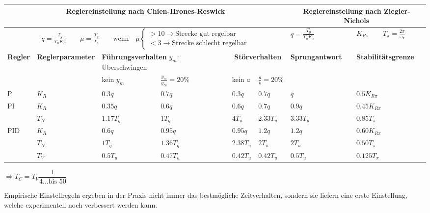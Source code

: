 	\begin{tabular}{|l|p{1.8cm}|l|l|l|l||l|l|}
	    \hline
	    \multicolumn{6}{|c||}{
	      \textbf{Reglereinstellung nach Chien-Hrones-Reswick}
	    } &
	    \multicolumn{2}{|c|}{
	      \textbf{Reglereinstellung nach Ziegler-Nichols}
	    }
		\\ \hline
		\multicolumn{6}{|c||}{
		  $
		  q = \frac{T_g}{T_uK_S} \qquad \mu = \frac{T_g}{T_u}
		  \qquad \text{wenn} \quad \mu
		  \begin{cases}
		    > 10 \rightarrow \text{Strecke gut regelbar} \\
		    < 3 \rightarrow \text{Strecke schlecht regelbar}
		  \end{cases}
		  $
		} & $q=\frac{T_g}{T_uK_s}$ & $K_{R\pi} \qquad T_\pi=\frac{2\pi}{\omega_\pi}$
		\\ \hline
		\textbf{Regler} & \textbf{Regler\-parameter} &
		\multicolumn{2}{|p{3.5cm}|}{\textbf{Führungsverhalten} \newline $y_m$:
		Überschwingen} &
		\multicolumn{2}{|c||}{\textbf{Störverhalten}} &
		\textbf{Sprungantwort} & \textbf{Stabilitätsgrenze}
		\\ \hline
		& & kein $y_m$ & $\frac{y_m}{y_\infty} = 20 \%$ & kein $a$ & $\frac{a}{b}= 20 \%$ & &
		\\ \hline
		P 	& $K_R$ 	& $0.3q$ 	& $0.7q$ 	& $0.3q$ 	& $0.7q$	& $q$ 	& $0.5K_{R\pi}$
		\\ \hline
		PI	& $K_R$		& $0.35q$	& $0.6q$	& $0.6q$	& $0.7q$	& $0.9q$ 	& $0.45K_{R\pi}$
		\\
		    & $T_N$		& $1.17T_g$	& $1T_g$	& $4T_u$	& $2.33T_u$ & $3.33T_u$ &
		    $0.85T_{\pi}$ \\ \hline
		PID & $K_R$		& $0.6q$	& $0.95q$	& $0.95q$	& $1.2q$ 	& $1.2q$ 	& $0.60K_{R\pi}$
		\\
			& $T_N$		& $1T_g$	& $1.36T_g$	& $2.38T_u$	& $2T_u$ 	& $2T_u$	& $0.50T_\pi$
		\\
			& $T_V$		& $0.5T_u$	& $0.47T_u$	& $0.42T_u$	& $0.42T_u$ & $0.5T_u$ 	& $0.125T_\pi$
		\\ \hline
	\end{tabular}
  
  \parbox{5cm}{$\Rightarrow \boxed{T_C = T_V\dfrac{1}{4 \ldots \text{bis } 50}}$}
  \parbox{14cm}{Empirische Einstellregeln ergeben in der Praxis nicht immer das bestmögliche Zeitverhalten, sondern sie liefern eine erste Einstellung, welche experimentell noch verbessert werden kann.} \\ \\
  
